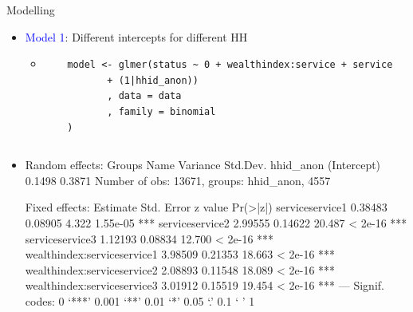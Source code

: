 \documentclass{beamer}
\begin{document}
\begin{frame}[fragile]{Modelling}
\begin{itemize}[<+->]
\item \textcolor{blue}{Model 1}: Different intercepts for different HH

\begin{itemize}[<+->]
\item[]
\tiny{
\begin{verbatim}
	model <- glmer(status ~ 0 + wealthindex:service + service 
		   + (1|hhid_anon))
		   , data = data
		   , family = binomial
	)
\end{verbatim}
}
\end{itemize}
\item[]
\begin{columns}[t]
\vspace{-4.5cm}
\begin{verbbox}
Random effects:
 Groups    Name        Variance Std.Dev.
 hhid_anon (Intercept) 0.1498   0.3871
Number of obs: 13671, groups:  hhid_anon, 4557

Fixed effects:
                            Estimate Std. Error z value Pr(>|z|)
serviceservice1              0.38483    0.08905   4.322 1.55e-05 ***
serviceservice2              2.99555    0.14622  20.487  < 2e-16 ***
serviceservice3              1.12193    0.08834  12.700  < 2e-16 ***
wealthindex:serviceservice1  3.98509    0.21353  18.663  < 2e-16 ***
wealthindex:serviceservice2  2.08893    0.11548  18.089  < 2e-16 ***
wealthindex:serviceservice3  3.01912    0.15519  19.454  < 2e-16 ***
---
Signif. codes:  0 ‘***’ 0.001 ‘**’ 0.01 ‘*’ 0.05 ‘.’ 0.1 ‘ ’ 1


\end{verbbox}
\end{columns}
\end{itemize}
\end{frame}
\end{document}
